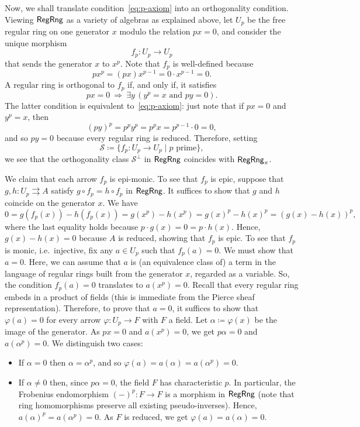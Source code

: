 \documentclass[a4paper,10pt,reqno]{amsart}
\theoremstyle{definition}
\theoremstyle{remark}
\renewcommand{\phi}{\varphi}
\newcommand{\RegRng}{{\sf RegRng}}						%
\newcommand{\ar}[1]{\mathcal{#1}}							%
\newcommand{\ort}[1]{{#1}^{\perp}}						%
\newcommand{\IMP}{\Rightarrow}						%
\begin{document}
Now, we shall translate condition~\eqref{eq:p-axiom} into an orthogonality condition. Viewing $\RegRng$ as a variety of algebras as explained above, let $U_{p}$ be the free regular ring on one generator $x$ modulo the relation $px=0$, and consider the unique morphism
\[
f_{p}\colon U_{p}\to U_{p}
\]
that sends the generator $x$ to $x^{p}$. Note that $f_{p}$ is well-defined because
\[
p x^{p} = (px) x^{p-1} = 0\cdot x^{p-1}=0.
\]
A regular ring is orthogonal to $f_{p}$ if, and only if, it satisfies 
\[
px = 0 \ \IMP \ \exists y \, (y^{p}=x \text{ and } py=0).
\]
The latter condition is equivalent to~\eqref{eq:p-axiom}: just note that if $px=0$ and $y^{p}=x$, then 
\[
(py)^{p} = p^{p} y^{p} = p^{p} x = p^{p-1} \cdot 0 = 0,
\]
and so $py=0$ because every regular ring is reduced. Therefore, setting
\[
\ar{S}\coloneqq \{f_{p}\colon U_{p}\to U_{p} \mid p \text{ prime}\},
\]
we see that the orthogonality class $\ort{\ar{S}}$ in $\RegRng$ coincides with $\RegRng_{\pi}$.

We claim that each arrow $f_{p}$ is epi-monic. To see that $f_{p}$ is epic, suppose that $g,h\colon U_{p}\rightrightarrows A$ satisfy $g\circ f_{p} = h\circ f_{p}$ in $\RegRng$. It suffices to show that $g$ and $h$ coincide on the generator $x$. We have
\[
0 = g(f_{p}(x)) - h(f_{p}(x)) = g(x^{p}) - h(x^{p}) = g(x)^{p} - h(x)^{p} = (g(x)-h(x))^{p},
\]
where the last equality holds because $p\cdot g(x)=0=p\cdot h(x)$. Hence, $g(x)-h(x)=0$ because $A$ is reduced, showing that $f_{p}$ is epic. To see that $f_{p}$ is monic, i.e.\ injective, fix any $a\in U_{p}$ such that $f_{p}(a)=0$. We must show that $a=0$. Here, we can assume that $a$ is (an equivalence class of) a term in the language of regular rings built from the generator $x$, regarded as a variable. So, the condition $f_{p}(a)=0$ translates to $a(x^{p})=0$. Recall that every regular ring embeds in a product of fields (this is immediate from the Pierce sheaf representation). Therefore, to prove that $a=0$, it suffices to show that $\phi(a)=0$ for every arrow $\phi\colon U_{p}\to F$ with $F$ a field. Let $\alpha\coloneqq \phi(x)$ be the image of the generator. As $px=0$ and $a(x^{p})=0$, we get $p\alpha = 0$ and $a(\alpha^{p})=0$. We distinguish two cases:
%
\begin{itemize}
\item If $\alpha = 0$ then $\alpha = \alpha^{p}$, and so $\phi(a) = a(\alpha) = a(\alpha^{p}) = 0$.
\item If $\alpha \neq 0$ then, since $p\alpha = 0$, the field $F$ has characteristic $p$. In particular, the Frobenius endomorphism $(-)^{p}\colon F \to F$ is a morphism in $\RegRng$ (note that ring homomorphisms preserve all existing pseudo-inverses). Hence, $a(\alpha)^{p} = a(\alpha^{p}) = 0$. As $F$ is reduced, we get $\phi(a)=a(\alpha)=0$.
\end{itemize}
\end{document}
